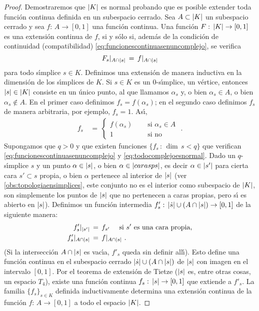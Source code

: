 \begin{proof}%
	Demostraremos que $\left|K\right|$ es normal probando que es
	posible extender toda funci\'{o}n continua definida en un subespacio
	cerrado. Sea $A\subset\left|K\right|$ un subespacio cerrado y sea
	$f:\,A\rightarrow [0,1]$ una funci\'{o}n continua. Una funci\'{o}n
	$F:\,\left|K\right|\rightarrow [0,1]$ es una extensi\'{o}n continua de $f$,
	si y s\'{o}lo si, adem\'{a}s de la condici\'{o}n de continuidad
	(compatibilidad) \eqref{eq:funcionescontinuasenuncomplejo}, se
	verifica
	\begin{equation}
		\label{eq:todocomplejoesnormal}
		F_{s}|_{A\cap\left|s\right|} \,=\,f|_{A\cap\left|s\right|}
	\end{equation}
	para todo s\'{\i}mplice $s\in K$. Definimos una extensi\'{o}n de
	manera inductiva en la dimensi\'{o}n de los s\'{\i}mplices de $K$.
	Si $s\in K$ es un $0$-s\'{\i}mplice, un v\'{e}rtice, entonces
	$\left|s\right|\in\left|K\right|$ consiste en un \'{u}nico punto, al que llamamos
	$\alpha_{s}$ y, o bien $\alpha_{s}\in A$, o bien
	$\alpha_{s}\not\in A$. En el primer caso definimos
	$f_{s}=f(\alpha_{s})$; en el segundo caso definimos $f_{s}$ de manera
	arbitraria, por ejemplo, $f_{s}=1$. As\'{\i},
	\begin{align*}
		f_{s} & \,=\,
			\begin{cases}
				f(\alpha_{s}) & \quad\text{ si }
					\alpha_{s}\in A \\
				1 & \quad\text{ si no}
			\end{cases}
		\text{ .}
	\end{align*}
	Supongamos que $q>0$ y que existen funciones $\{f_{s}\,:\,\dim\,s<q\}$
	que verifican \eqref{eq:funcionescontinuasenuncomplejo} y
	\eqref{eq:todocomplejoesnormal}. Dado un $q$-s\'{\i}mplice $s$ y un
	punto $\alpha\in\left|s\right|$, o bien $\alpha\in\left|carasp{s}\right|$, es
	decir $\alpha\in\left|s'\right|$ para cierta cara $s'\subset s$ propia,
	o bien $\alpha$ pertenece al interior de $\left|s\right|$ (ver
	\ref{obs:topologiaensimplices}, este conjunto no es el interior
	como subespacio de $\left|K\right|$, son simplemente los puntos de
	$\left|s\right|$ que no pertenecen a caras propias, pero s\'{\i} es abierto
	en $\left|s\right|$). Definimos un funci\'{o}n intermedia
	$f'_{s}:\,\left|\dot{s}\right|\cup (A\cap\left|s\right|)\rightarrow [0,1]$
	de la siguiente manera:
	\begin{align*}
		f'_{s}|_{\left|s'\right|} & \,=\,f_{s'}
			\quad\text{ si } s'\text{ es una cara propia,} \\
		f'_{s}|_{A\cap\left|s\right|} & \,=\,f|_{A\cap\left|s\right|}\text{ .}
	\end{align*}
	(Si la intersecci\'{o}n $A\cap\left|s\right|$ es vac\'{\i}a, $f'_{s}$
	queda sin definir all\'{\i}). Esto define una funci\'{o}n continua
	en el subespacio cerrado $\left|\dot{s}\right|\cup (A\cap\left|s\right|)$ de
	$\left|s\right|$ con imagen en el intervalo $[0,1]$. Por el teorema de
	extensi\'{o}n de Tietze ($\left|s\right|$ es, entre otras cosas, un
	espacio $T_{4}$), existe una funci\'{o}n continua
	$f_{s}:\,\left|s\right|\rightarrow [0,1]$ que extiende a $f'_{s}$. La
	familia $\{f_{s}\}_{s\in K}$ definida inductivamente determina una
	extensi\'{o}n continua de la funci\'{o}n $f:\,A\rightarrow [0,1]$ a
	todo el espacio $\left|K\right|$.
\end{proof}

